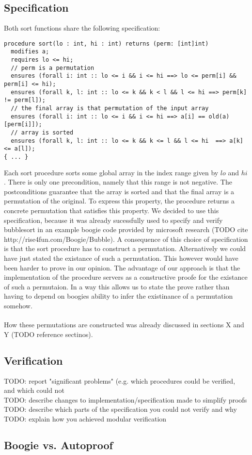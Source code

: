 \subsection{Specification}

Both sort functions share the following specification:

\begin{verbatim}
procedure sort(lo : int, hi : int) returns (perm: [int]int)
  modifies a;
  requires lo <= hi;
  // perm is a permutation
  ensures (forall i: int :: lo <= i && i <= hi ==> lo <= perm[i] && perm[i] <= hi);
  ensures (forall k, l: int :: lo <= k && k < l && l <= hi ==> perm[k] != perm[l]);
  // the final array is that permutation of the input array
  ensures (forall i: int :: lo <= i && i <= hi ==> a[i] == old(a)[perm[i]]);
  // array is sorted
  ensures (forall k, l: int :: lo <= k && k <= l && l <= hi  ==> a[k] <= a[l]);
{ ... }
\end{verbatim}

Each sort procedure sorts some global array in the index range given by $lo$ and $hi$. 
There is only one precondition, namely that this range is not negative. The postconditions guarantee that the
array is sorted and that the final array is a permutation of the original. To express this property, the procedure
returns a concrete permutation that satisfies this property. 
We decided to use this specification, because it was already sucessfully used to 
specify and verify bubblesort in an example boogie code provided by microsoft research 
(TODO cite http://rise4fun.com/Boogie/Bubble). A consequence of this choice of specification is that the sort procedure has
to construct a permutation. Alternatively we could have just stated the existance of such a permutation. This however would have
been harder to prove in our opinion. The advantage of our approach is that the implementation of the procedure servers as a constructive
proofe for the existance of such a permutaion. In a way this allows us to state the prove rather than having to depend on boogies ability to 
infer the existinance of a permutation somehow.
\\\\
How these permutations are constructed was already discussed in sections X and Y (TODO reference sectinos).

\subsection{Verification}
TODO: report "significant problems" (e.g. which procedures could be verified, and which could not\\
TODO: describe changes to implementation/specification made to simplify proofs\\
TODO: describe which parts of the specification you could not verify and why\\
TODO: explain how you achieved modular verification

\subsection{Boogie vs. Autoproof}
